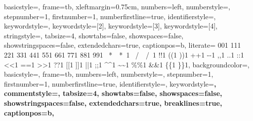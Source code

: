 {}


 {%
	basicstyle={\small\ttfamily},   
	frame=tb,
	xleftmargin={0.75cm},
	numbers=left,
	numberstyle=\scriptsize\ttfamily\color{gray},
	stepnumber=1,
	firstnumber=1,
	numberfirstline=true,
	identifierstyle=\color{black},
	keywordstyle={\color{magenta}},
	keywordstyle={[2]{\color{primaryKeywords}}},
	keywordstyle={[3]{\color{secondaryKeywords}}},
	keywordstyle={[4]{\color{magenta}}},
	stringstyle=\color{editorOcher}\ttfamily,
	tabsize=4,
	showtabs=false,
	showspaces=false,
	showstringspaces=false,
	extendedchars=true,
	captionpos=b,
	literate=%
{0}{{{\color{numbers}0}}}1
{1}{{{\color{numbers}1}}}1
{2}{{{\color{numbers}2}}}1
{3}{{{\color{numbers}3}}}1
{4}{{{\color{numbers}4}}}1
{5}{{{\color{numbers}5}}}1
{6}{{{\color{numbers}6}}}1
{7}{{{\color{numbers}7}}}1
{8}{{{\color{numbers}8}}}1
{9}{{{\color{numbers}9}}}1
{\ *\ }{{{\color{magenta}\ *\ }}}{1}
{\ /\ }{{{\color{magenta}\ /\ }}}{1}
{!}{{{\color{magenta}!}}}{1}
{(}{{{\color{magenta}(}}}{1}
{)}{{{\color{magenta})}}}{1}
{+}{{{\color{magenta}+}}}{1}
{-}{{{\color{magenta}-}}}{1}
{,}{{{\color{magenta},}}}{1}
{.}{{{\color{magenta}.}}}{1}
{:}{{{\color{magenta}:}}}{1}
{<}{{{\color{magenta}<}}}{1}
{=}{{{\color{magenta}=}}}{1}
{>}{{{\color{magenta}>}}}{1}
{?}{{{\color{magenta}?}}}{1}
{[}{{{\color{magenta}[}}}{1}
{]}{{{\color{magenta}]}}}{1}
{|}{{{\color{magenta}|}}}{1}
{;}{{{\color{magenta};}}}{1}
{\^{}}{{{\color{magenta}\^{}}}}{1}
{\~{}}{{{\color{magenta}\~{}}}}{1}
{\%}{{{\color{magenta}\%}}}{1}
{\&}{{{\color{magenta}\&}}}{1}
{\{}{{{\color{magenta}\{}}}{1}
{\}}{{{\color{magenta}\}}}}{1},
}
 {%
	backgroundcolor=\color{editorGray},
	basicstyle={\small\ttfamily},   
	frame=tb,
	numbers=left,
	numberstyle=\scriptsize\ttfamily,
	stepnumber=1,
	firstnumber=1,
	numberfirstline=true,	
	identifierstyle=\ttfamily,
	keywordstyle=\bfseries,
	commentstyle=\color{gray}\ttfamily,
	tabsize=4,
	showtabs=false,
	showspaces=false,
	showstringspaces=false,
	extendedchars=true,
	breaklines=true,
	captionpos=b,
}
